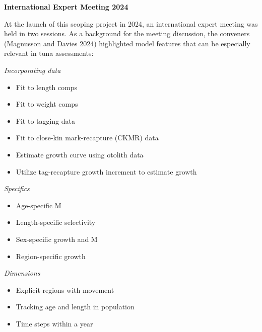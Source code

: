 \documentclass{SCreport}
\begin{document}
\newpage

\textbf{International Expert Meeting 2024}

At the launch of this scoping project in 2024, an international expert meeting
was held in two sessions. As a background for the meeting discussion, the
conveners (Magnusson and Davies 2024) highlighted model features that can be
especially relevant in tuna assessments:

\vspace{1ex}

\textit{Incorporating data}

\begin{itemize}
  \item Fit to length comps\\[-4.5ex]
  \item Fit to weight comps\\[-4.5ex]
  \item Fit to tagging data\\[-4.5ex]
  \item Fit to close-kin mark-recapture (CKMR) data\\[-4.5ex]
  \item Estimate growth curve using otolith data\\[-4.5ex]
  \item Utilize tag-recapture growth increment to estimate growth
\end{itemize}

\vspace{1ex}

\textit{Specifics}

\begin{itemize}
  \item Age-specific M\\[-4.5ex]
  \item Length-specific selectivity\\[-4.5ex]
  \item Sex-specific growth and M\\[-4.5ex]
  \item Region-specific growth
\end{itemize}

\vspace{1ex}

\textit{Dimensions}

\begin{itemize}
  \item Explicit regions with movement\\[-4.5ex]
  \item Tracking age and length in population\\[-4.5ex]
  \item Time steps within a year
\end{itemize}
\end{document}

